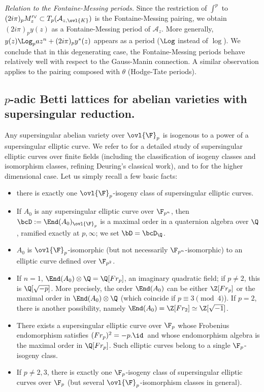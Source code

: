 \begin{para}
 {\itshape Relation to the Fontaine-Messing periods.} Since the restriction
 of $\int^p$ to $(2i\pi)_p M_z^{\prime \vee}\subset
 T_p(\mathcal{A}_{z,\ovl{K}})$ is the Fontaine-Messing pairing, we
 obtain $(2i\pi)_p y(z)$ as a Fontaine-Messing period of
 $\mathcal{A}_z$. More generally, $y(z)\Log_p az^n +(2i\pi)_p
 y^{\ast}(z)$ appears as a period ($\Log$ instead of $\log$). We conclude
 that in this degenerating case, the Fontaine-Messing periods behave
 relatively well with respect to the Gauss-Manin connection. A similar
 observation applies to the pairing composed with $\theta$ (Hodge-Tate
 periods).
\end{para}

\subsection{$p$-adic Betti lattices for abelian varieties with
supersingular reduction.}\label{sub-p-adic-betti-lattice-supersing}

\begin{para}\label{para-ss-abelian}
 Any supersingular abelian variety over $\ovl{\F}_p$ is isogenous to
 a power of a supersingular elliptic curve. We refer to
 \cite[4]{waterhouse69:_abelian} for a detailed study of supersingular
 elliptic curves over finite fields (including the classification of
 isogeny classes and isomorphism classes, refining Deuring's classical
 work), and to \cite{li_o98:_modul} for the higher dimensional case. Let
 us simply recall a few basic facts:
 \begin{itemize}
  \item there is exactly one ${\ovl{\F}_p}$-isogeny class of
	supersingular elliptic curves.
  \item If $A_0$ is any supersingular elliptic curve over
	${\F}_{p^n}$, then $\bcD:= \End(A_0)_{\ovl{\F}_p}$ 
	is a maximal order in a quaternion algebra over $\Q$, ramified
	exactly at $p,\infty$; we set $\bD=\bcD_{\Q}$.
  \item $A_0$ is ${\ovl{\F}_p}$-isomorphic (but not necessarily
	${\F}_{p^n}$-isomorphic) to an elliptic curve defined over
	${\F}_{p^2}$.
  \item If $n=1$, $\End(A_0)\otimes {\Q}={\Q}[Fr_{p}]$, an
	imaginary quadratic field; if $p\neq 2$, this is
	${\Q}[\sqrt{-p}]$. More precisely, the order $\End(A_0)$ can be either 
	${\Z}[Fr_{p}]$ or the maximal order in $\End(A_0)\otimes
	{\Q}$ (which coincide if $p\equiv 3\pmod{4}$). If $p=2$, there is
	another possibility, namely $\End(A_0)={\Z}[Fr_2]\simeq
	{\Z}[\sqrt{-1}]$.
  \item There exists a supersingular elliptic
	curve over ${\F}_p$ whose Frobenius endomorphism satisfies
	$(Fr_p)^2=-p.\id\,$ and whose endomorphism algebra is the maximal
	order in ${\Q}[Fr_{p}]$. Such elliptic curves belong to a single
	${\F}_p$-isogeny class.
  \item If $p\neq 2,3$, there is exactly one ${\F}_p$-isogeny class of
	supersingular elliptic curves over ${\F}_p$ (but several
	${\ovl{\F}_p}$-isomorphism classes in general).
 \end{itemize}
\end{para}

